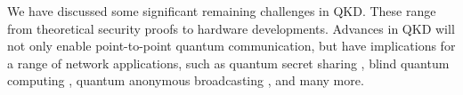 





We have discussed some significant remaining challenges in QKD. These range from theoretical security proofs to hardware developments. Advances in QKD will not only enable point-to-point quantum communication, but have implications for a range of network applications, such as quantum secret sharing \cite{bib:cleve1999share, bib:PhysRevA.61.042311, bib:PhysRevA.71.044301}, blind quantum computing \cite{bib:broadbent2009universal, bib:barz2012demonstration}, quantum anonymous broadcasting \cite{bib:christandl2005quantum}, and many more.




